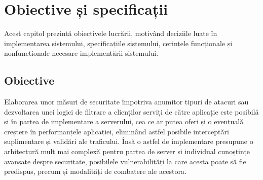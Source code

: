 
 \chapter{Obiective și specificații}
\label{cap:obiective-specificatii}

%

Acest capitol prezintă obiectivele lucrării, motivând deciziile luate în implementarea sistemului, specificațiile sistemului, cerințele funcționale și nonfunctionale necesare implementării sistemului. 

 \section{Obiective}
%
Elaborarea unor măsuri de securitate împotriva anumitor tipuri de atacuri sau dezvoltarea unei logici de filtrare a clienților serviți de către aplicație este posibilă și în partea de implementare a serverului, cea ce ar putea oferi și o eventuală creștere în performanțele aplicației, eliminând astfel posibile interceptări suplimentare și validări ale traficului. Însă o astfel de implementare presupune o arhitectură mult mai complexă pentru partea de server și individual cunoștințe avansate despre securitate, posibilele vulnerabilități la care acesta poate să fie predispus, precum și modalități de combatere ale acestora.  
  

